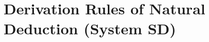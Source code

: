 

\fi





\section*{\hfill \normalsize \bf Derivation Rules of Natural Deduction (System SD) \hfill} 
\label{nd-proofrules}
				
